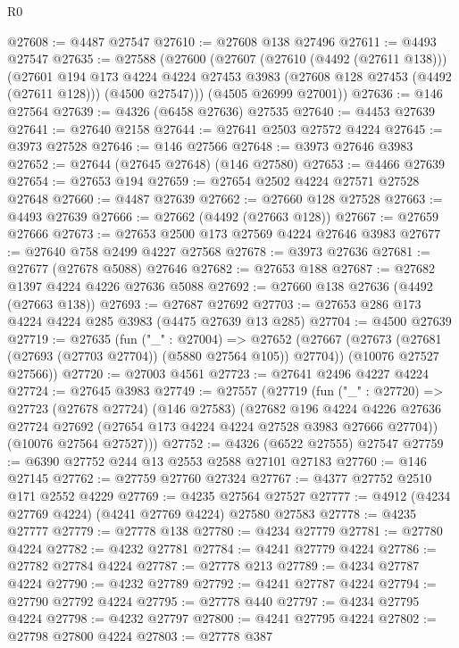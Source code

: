 \begin{lexlean}{R0}
\begin{coremodule}
@27608 := @4487 @27547
@27610 := @27608 @138 @27496
@27611 := @4493 @27547
@27635 := @27588
    (@27600
      (@27607
        (@27610 (@4492 (@27611 @138)))
        (@27601
          @194
          @173
          @4224
          @4224
          @27453
          @3983
          (@27608 @128 @27453 (@4492 (@27611 @128)))
          (@4500 @27547)))
      (@4505 @26999 @27001))
@27636 := @146 @27564
@27639 := @4326 (@6458 @27636) @27535
@27640 := @4453 @27639
@27641 := @27640 @2158
@27644 := @27641 @2503 @27572 @4224
@27645 := @3973 @27528
@27646 := @146 @27566
@27648 := @3973 @27646 @3983
@27652 := @27644 (@27645 @27648) (@146 @27580)
@27653 := @4466 @27639
@27654 := @27653 @194
@27659 := @27654 @2502 @4224 @27571 @27528 @27648
@27660 := @4487 @27639
@27662 := @27660 @128 @27528
@27663 := @4493 @27639
@27666 := @27662 (@4492 (@27663 @128))
@27667 := @27659 @27666
@27673 := @27653 @2500 @173 @27569 @4224 @27646 @3983
@27677 := @27640 @758 @2499 @4227 @27568
@27678 := @3973 @27636
@27681 := @27677 (@27678 @5088) @27646
@27682 := @27653 @188
@27687 := @27682 @1397 @4224 @4226 @27636 @5088
@27692 := @27660 @138 @27636 (@4492 (@27663 @138))
@27693 := @27687 @27692
@27703 := @27653 @286 @173 @4224 @4224 @285 @3983 (@4475 @27639 @13 @285)
@27704 := @4500 @27639
@27719 := @27635
    (fun ("_" : @27004) =>
    @27652
      (@27667 (@27673 (@27681 (@27693 (@27703 @27704)) (@5880 @27564 @105)) @27704))
      (@10076 @27527 @27566))
@27720 := @27003 @4561
@27723 := @27641 @2496 @4227 @4224
@27724 := @27645 @3983
@27749 := @27557
    (@27719
      (fun ("_" : @27720) =>
      @27723
        (@27678 @27724)
        (@146 @27583)
        (@27682
          @196
          @4224
          @4226
          @27636
          @27724
          @27692
          (@27654 @173 @4224 @4224 @27528 @3983 @27666 @27704))
        (@10076 @27564 @27527)))
@27752 := @4326 (@6522 @27555) @27547
@27759 := @6390 @27752 @244 @13 @2553 @2588 @27101 @27183
@27760 := @146 @27145
@27762 := @27759 @27760 @27324
@27767 := @4377 @27752 @2510 @171 @2552 @4229
@27769 := @4235 @27564 @27527
@27777 := @4912 (@4234 @27769 @4224) (@4241 @27769 @4224) @27580 @27583
@27778 := @4235 @27777
@27779 := @27778 @138
@27780 := @4234 @27779
@27781 := @27780 @4224
@27782 := @4232 @27781
@27784 := @4241 @27779 @4224
@27786 := @27782 @27784 @4224
@27787 := @27778 @213
@27789 := @4234 @27787 @4224
@27790 := @4232 @27789
@27792 := @4241 @27787 @4224
@27794 := @27790 @27792 @4224
@27795 := @27778 @440
@27797 := @4234 @27795 @4224
@27798 := @4232 @27797
@27800 := @4241 @27795 @4224
@27802 := @27798 @27800 @4224
@27803 := @27778 @387

\end{coremodule}
\end{lexlean}
